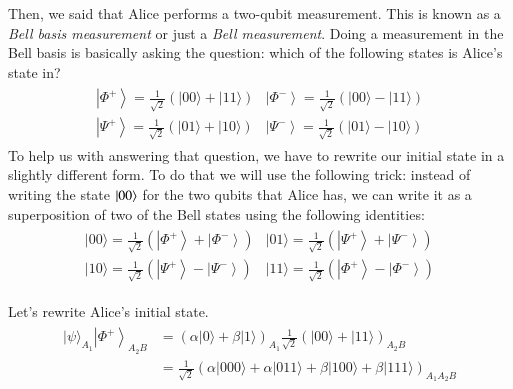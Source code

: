 Then, we said that Alice performs a two-qubit measurement. This is known as a \emph{Bell basis measurement} or just a \emph{Bell measurement}.
Doing a measurement in the Bell basis is basically asking the question: which of the following states is Alice's state in? 
\begin{align}
    \begin{array}{ll}
\left|\Phi^{+}\right\rangle=\frac{1}{\sqrt{2}}(|00\rangle+|11\rangle) & \left|\Phi^{-}\right\rangle=\frac{1}{\sqrt{2}}(|00\rangle-|11\rangle) \\
\left|\Psi^{+}\right\rangle=\frac{1}{\sqrt{2}}(|01\rangle+|10\rangle) & \left|\Psi^{-}\right\rangle=\frac{1}{\sqrt{2}}(|01\rangle-|10\rangle)
\end{array}
\end{align}
To help us with answering that question, we have to rewrite our initial state in a slightly different form. To do that we will use the following trick: instead of writing the state $\left| 00 \right\rangle$ for the two qubits that Alice has, we can write it as a superposition of two of the Bell states using the following identities:
\begin{align}
    \begin{array}{ll}
|00\rangle=\frac{1}{\sqrt{2}}\left(\left|\Phi^{+}\right\rangle+\left|\Phi^{-}\right\rangle\right) & |01\rangle=\frac{1}{\sqrt{2}}\left(\left|\Psi^{+}\right\rangle+\left|\Psi^{-}\right\rangle\right) \\
|10\rangle=\frac{1}{\sqrt{2}}\left(\left|\Psi^{+}\right\rangle-\left|\Psi^{-}\right\rangle\right) & |11\rangle=\frac{1}{\sqrt{2}}\left(\left|\Phi^{+}\right\rangle-\left|\Phi^{-}\right\rangle\right)
\end{array}
\end{align}

Let's rewrite Alice's initial state. %
\begin{align}
    \begin{aligned}
|\psi\rangle_{A_{1}}\left|\Phi^{+}\right\rangle_{A_{2} B} &=(\alpha|0\rangle+\beta|1\rangle)_{A_{1}} \frac{1}{\sqrt{2}}(|00\rangle+|11\rangle)_{A_{2} B} \\
&=\frac{1}{\sqrt{2}}(\alpha|000\rangle+\alpha|011\rangle+\beta|100\rangle+\beta|111\rangle)_{A_{1} A_{2} B}
\end{aligned}
\end{align}

